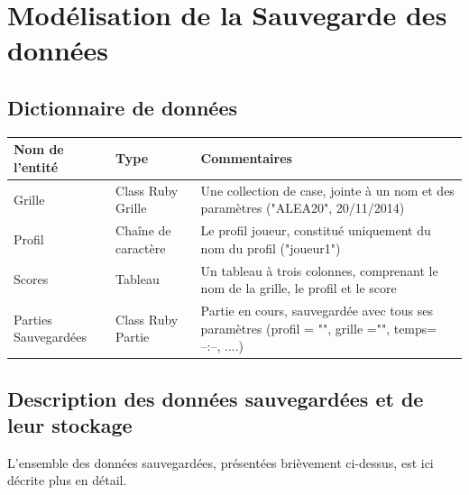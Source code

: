\documentclass[11pt]{article}
\begin{document}

\newpage

\section{Modélisation de la Sauvegarde des données}

\subsection{Dictionnaire de données}


\begin{tabular}{|p{4cm}|p{3cm}|p{8cm}|} \hline 
    {\bf Nom de l'entité} & {\bf Type } & {\bf Commentaires}\\ \hline \hline
    Grille & Class Ruby Grille & Une collection de case, jointe à un nom et des paramètres ("ALEA20", 20/11/2014)\\ \hline
    Profil & Chaîne de caractère & Le profil joueur, constitué uniquement du nom du profil ("joueur1")\\ \hline
    Scores & Tableau & Un tableau à trois colonnes, comprenant le nom de la grille, le profil et le score\\ \hline
    Parties Sauvegardées & Class Ruby Partie & Partie en cours, sauvegardée avec tous ses paramètres (profil = "", grille ="", temps= --:--, ....) \\ \hline 
\end{tabular}

\subsection{Description des données sauvegardées et de leur stockage}
L'ensemble des données sauvegardées, présentées brièvement ci-dessus, est ici décrite plus en détail.
\end{document}
